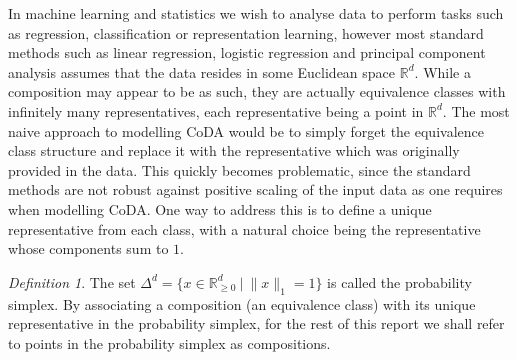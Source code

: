 \documentclass[BSc]{usydthesis}
\numberwithin{equation}{chapter}
\theoremstyle{remark}
\newtheorem{Definition}[equation]{Definition}
\begin{document}
In machine learning and statistics we wish to analyse data to perform tasks such as regression, classification or representation learning, however most standard methods such as linear regression, logistic regression and principal component analysis assumes that the data resides in some Euclidean space $\mathbb{R}^d.$ While a composition may appear to be as such, they are actually equivalence classes with infinitely many representatives, each representative being a point in $\mathbb{R}^d.$ The most naive approach to modelling CoDA would be to simply forget the equivalence class structure and replace it with the representative which was originally provided in the data. This quickly becomes problematic, since the standard methods are not robust against positive scaling of the input data as one requires when modelling CoDA. One way to address this is to define a unique representative from each class, with a natural choice being the representative whose components sum to $1.$ 

\begin{Definition}
The set $\Delta^d = \{ x \in \mathbb{R}^d_{\geq 0} \ | \ \| x \|_1 = 1 \}$ is called the probability simplex. By associating a composition (an equivalence class) with its unique representative in the probability simplex, for the rest of this report we shall refer to points in the probability simplex as compositions. 
\end{Definition}
\end{document}
